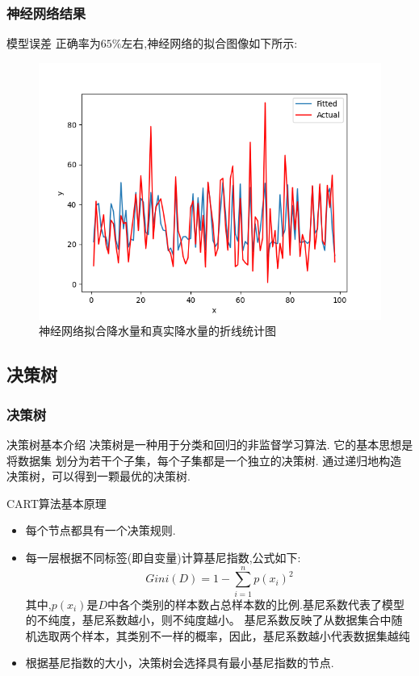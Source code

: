 \documentclass[10pt]{beamer}
\begin{document}
\begin{frame}
	\frametitle{神经网络结果}
	\begin{block}{模型误差}
		正确率为$65\%$左右,神经网络的拟合图像如下所示:
		\begin{figure}[h!]
			\centering
			\includegraphics[scale=0.4]{../latex/success.png}
			\caption{神经网络拟合降水量和真实降水量的折线统计图}
		\end{figure}
	\end{block}
\end{frame}

\subsection{决策树}

\begin{frame}
	\frametitle{决策树}
	\begin{block}{决策树基本介绍}
		决策树是一种用于分类和回归的非监督学习算法. 它的基本思想是将数据集
		划分为若干个子集，每个子集都是一个独立的决策树. 通过递归地构造
		决策树，可以得到一颗最优的决策树.
	\end{block}

	\begin{block}{CART算法基本原理}
		\begin{itemize}
			\item 每个节点都具有一个决策规则.
			\item 每一层根据不同标签(即自变量)计算基尼指数,公式如下:
			      \begin{equation}
				      Gini(D) = 1-\sum_{i=1}^{n}{{p(x_i)}^2}
			      \end{equation}
			      其中,$p(x_i)$是$D$中各个类别的样本数占总样本数的比例.基尼系数代表了模型的不纯度，基尼系数越小，则不纯度越小。
			      基尼系数反映了从数据集合中随机选取两个样本，其类别不一样的概率，因此，基尼系数越小代表数据集越纯
			\item 根据基尼指数的大小，决策树会选择具有最小基尼指数的节点.
		\end{itemize}
	\end{block}
\end{frame}
\end{document}
